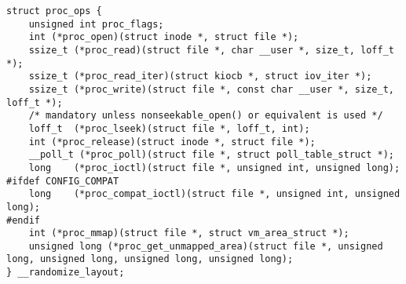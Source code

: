 
\begin{lstlisting}
struct proc_ops {
	unsigned int proc_flags;
	int	(*proc_open)(struct inode *, struct file *);
	ssize_t	(*proc_read)(struct file *, char __user *, size_t, loff_t *);
	ssize_t (*proc_read_iter)(struct kiocb *, struct iov_iter *);
	ssize_t	(*proc_write)(struct file *, const char __user *, size_t, loff_t *);
	/* mandatory unless nonseekable_open() or equivalent is used */
	loff_t	(*proc_lseek)(struct file *, loff_t, int);
	int	(*proc_release)(struct inode *, struct file *);
	__poll_t (*proc_poll)(struct file *, struct poll_table_struct *);
	long	(*proc_ioctl)(struct file *, unsigned int, unsigned long);
#ifdef CONFIG_COMPAT
	long	(*proc_compat_ioctl)(struct file *, unsigned int, unsigned long);
#endif
	int	(*proc_mmap)(struct file *, struct vm_area_struct *);
	unsigned long (*proc_get_unmapped_area)(struct file *, unsigned long, unsigned long, unsigned long, unsigned long);
} __randomize_layout;
\end{lstlisting}
